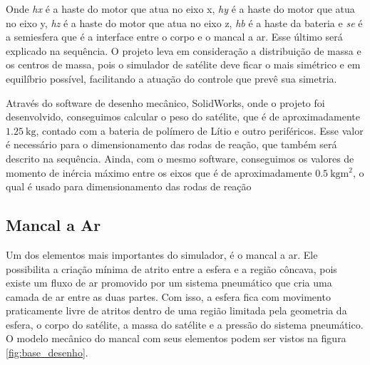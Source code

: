 Onde \textit{hx} é a haste do motor que atua no eixo x, \textit{hy} é a haste do motor que atua no eixo y, \textit{hz} é a haste do motor que atua no eixo z, \textit{hb} é a haste da bateria e \textit{se} é a semiesfera que é a interface entre o corpo e o mancal a ar. Esse último será explicado na sequência. O projeto leva em consideração a distribuição de massa e os centros de massa, pois o simulador de satélite deve ficar o mais simétrico e em equilíbrio possível, facilitando a atuação do controle que prevê sua simetria.

Através do software de desenho mecânico, SolidWorks, onde o projeto foi desenvolvido, conseguimos calcular o peso do satélite, que é de aproximadamente $\SI{1.25}{\kg}$, contado com a bateria de polímero de Lítio e outro periféricos. Esse valor é necessário para o dimensionamento das rodas de reação, que também será descrito na sequência. Ainda, com o mesmo software, conseguimos os valores de momento de inércia máximo entre os eixos que é de aproximadamente $\SI{0.5}{\kg\meter\squared}$, o qual é usado para dimensionamento das rodas de reação



\subsection{Mancal a Ar}

Um dos elementos mais importantes do simulador, é o mancal a ar. Ele possibilita a criação mínima de atrito entre a esfera e a região côncava, pois existe um fluxo de ar promovido por um sistema pneumático que cria uma camada de ar entre as duas partes. Com isso, a esfera fica com movimento praticamente livre de atritos dentro de uma região limitada pela geometria da esfera, o corpo do satélite, a massa do satélite e a pressão do sistema pneumático. O modelo mecânico do mancal com seus elementos podem ser vistos na figura \ref{fig:base_desenho}.

